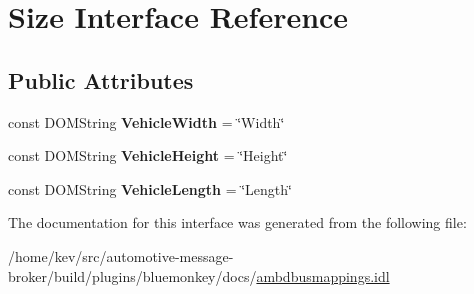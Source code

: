 \hypertarget{interfaceSize}{\section{Size Interface Reference}
\label{interfaceSize}
}
\subsection*{Public Attributes}
\begin{DoxyCompactItemize}
\item 
\hypertarget{interfaceSize_a7d257d4908f33668b20f23889e06997e}{const D\+O\+M\+String {\bfseries Vehicle\+Width} = \char`\"{}Width\char`\"{}}\label{interfaceSize_a7d257d4908f33668b20f23889e06997e}

\item 
\hypertarget{interfaceSize_a1ccc569716b80530444fbd764119dad9}{const D\+O\+M\+String {\bfseries Vehicle\+Height} = \char`\"{}Height\char`\"{}}\label{interfaceSize_a1ccc569716b80530444fbd764119dad9}

\item 
\hypertarget{interfaceSize_af3f8d8c9ff0550556fb0a1021a1bbe74}{const D\+O\+M\+String {\bfseries Vehicle\+Length} = \char`\"{}Length\char`\"{}}\label{interfaceSize_af3f8d8c9ff0550556fb0a1021a1bbe74}

\end{DoxyCompactItemize}


The documentation for this interface was generated from the following file\+:\begin{DoxyCompactItemize}
\item 
/home/kev/src/automotive-\/message-\/broker/build/plugins/bluemonkey/docs/\hyperlink{ambdbusmappings_8idl}{ambdbusmappings.\+idl}\end{DoxyCompactItemize}
